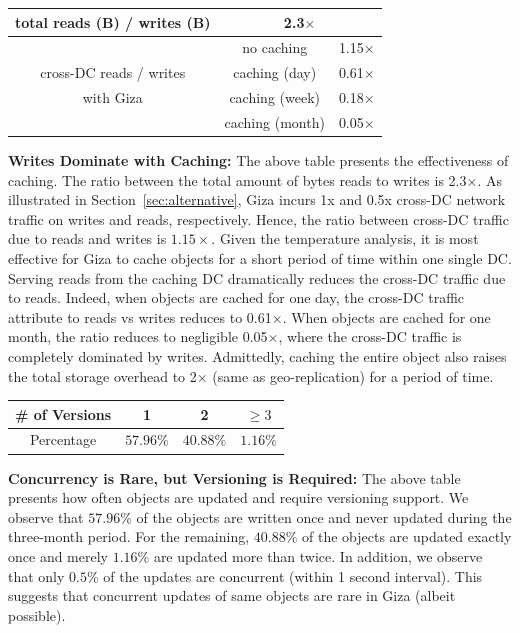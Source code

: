 \begin{table}[h]
\footnotesize
\centering
\begin{tabular}{|c||c|c|}
\hline \hline
total reads (B) / writes (B) 	& \multicolumn{2}{c|}{2.3$\times$}
\\ \hline \hline
	& no caching		& 1.15$\times$
\\ \cline{2-3}
cross-DC reads / writes
	& caching (day)		& 0.61$\times$ 
\\ \cline{2-3}
with Giza
	& caching (week)	& 0.18$\times$ 
\\ \cline{2-3}
	& caching (month)	& 0.05$\times$ 
\\ \hline \hline
\end{tabular}
\label{tab:caching}
\end{table}
{\bf Writes Dominate with Caching:} The above table presents the effectiveness of caching. The ratio between the total amount of bytes reads to writes is 2.3$\times$. 
As illustrated in Section~\ref{sec:alternative}, Giza incurs 1x and 0.5x
cross-DC network traffic on writes and reads, respectively. Hence, the ratio
between cross-DC traffic due to reads and writes is $1.15\times$. Given the
temperature analysis, it is most effective for Giza to cache objects for a short
period of time within one single DC. Serving reads from the caching DC
dramatically reduces the cross-DC traffic due to reads. Indeed, when objects are
cached for one day, the cross-DC traffic attribute to reads vs writes reduces to
0.61$\times$. When objects are cached for one month, the ratio reduces to
negligible 0.05$\times$, where the cross-DC traffic is completely dominated by
writes. Admittedly, caching the entire object also raises the total storage
overhead to 2$\times$ (same as geo-replication) for a period of time.

\begin{table}[h]
\footnotesize
\centering
\begin{tabular}{c||c|c|c}
\# of Versions 	& 	1				& 2					& $\ge 3$
\\ \hline
Percentage			& $57.96\%$	& $40.88\%$	& $1.16\%$
\end{tabular}
\label{tab:version}
\end{table}
{\bf Concurrency is Rare, but Versioning is Required:} The above table presents how often objects are updated and require versioning support. We observe that $57.96\%$ of the objects are written once and never updated during the three-month period. For the remaining, $40.88\%$ of the objects are updated exactly once and merely $1.16\%$ are updated more than twice. In addition, we observe that only $0.5\%$ of the updates
are concurrent (within 1 second interval). This suggests that concurrent updates of same objects are rare in Giza (albeit possible).

